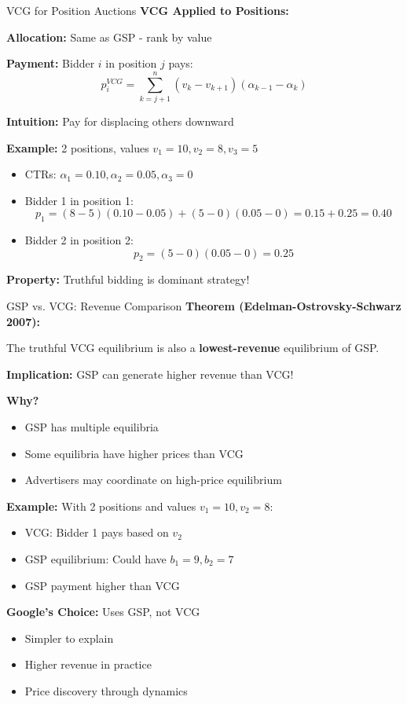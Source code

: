 \documentclass[xcolor={x11names}, aspectratio=169 ]{beamer}
\begin{document}
\begin{frame}{VCG for Position Auctions}
\textbf{VCG Applied to Positions:}

\textbf{Allocation:} Same as GSP - rank by value

\textbf{Payment:} Bidder $i$ in position $j$ pays:
$$p_i^{VCG} = \sum_{k=j+1}^{n} (v_k - v_{k+1})(\alpha_{k-1} - \alpha_k)$$

\textbf{Intuition:} Pay for displacing others downward

\textbf{Example:} 2 positions, values $v_1 = 10, v_2 = 8, v_3 = 5$
\begin{itemize}
  \item CTRs: $\alpha_1 = 0.10, \alpha_2 = 0.05, \alpha_3 = 0$
  \item Bidder 1 in position 1:
  $$p_1 = (8-5)(0.10 - 0.05) + (5-0)(0.05 - 0) = 0.15 + 0.25 = 0.40$$
  \item Bidder 2 in position 2:
  $$p_2 = (5-0)(0.05 - 0) = 0.25$$
\end{itemize}

\textbf{Property:} Truthful bidding is dominant strategy!
\end{frame}

\begin{frame}{GSP vs. VCG: Revenue Comparison}
\textbf{Theorem (Edelman-Ostrovsky-Schwarz 2007):}

The truthful VCG equilibrium is also a \textbf{lowest-revenue} equilibrium of GSP.

\textbf{Implication:} GSP can generate higher revenue than VCG!

\textbf{Why?}
\begin{itemize}
  \item GSP has multiple equilibria
  \item Some equilibria have higher prices than VCG
  \item Advertisers may coordinate on high-price equilibrium
\end{itemize}

\textbf{Example:} With 2 positions and values $v_1 = 10, v_2 = 8$:
\begin{itemize}
  \item VCG: Bidder 1 pays based on $v_2$
  \item GSP equilibrium: Could have $b_1 = 9, b_2 = 7$
  \item GSP payment higher than VCG
\end{itemize}

\textbf{Google's Choice:} Uses GSP, not VCG
\begin{itemize}
  \item Simpler to explain
  \item Higher revenue in practice
  \item Price discovery through dynamics
\end{itemize}
\end{frame}
\end{document}
